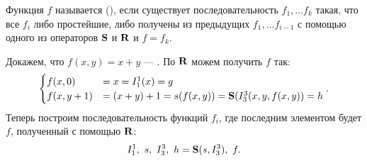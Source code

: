 \begin{defn}
	Функция $ f$ называется  (\prf), если 
	существует последовательность $ f_1, \ldots f_k$ такая, что
	все $ f_i$ либо простейшие, либо получены из предыдущих $ f_1, \ldots f_{i-1}$ с помощью одного из операторов $\S$ и $\R$ и $ f = f_k$.
\end{defn}


\begin{ex}\label{ex:1}
	Докажем, что $ f(x, y) = x + y$ --- \prf. По  $ \R$ можем получить $ f$ так:
	\[
	\begin{cases}
		f(x, 0) &= x = I^{1}_{1} (x) =g \\
		f(x, y+1) &= (x + y) + 1 = s(f(x, y)) = \S(I^{3}_{3} (x, y, f(x, y)) = h 
	\end{cases}
	.\] 
	Теперь построим последовательность функций $ f_i$, где последним элементом будет $ f$, полученный с помощью $ \R$: 
	\[
		I^{1}_{1} , ~s, ~I^{3}_{3} , ~ h = \S(s, I^{3}_{3}) ,~ f
	.\] 
\end{ex}


